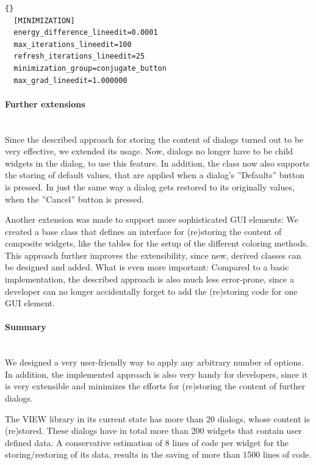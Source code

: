 \begin{lstlisting}{}
  [MINIMIZATION]
  energy_difference_lineedit=0.0001
  max_iterations_lineedit=100
  refresh_iterations_lineedit=25
  minimization_group=conjugate_button
  max_grad_lineedit=1.000000
\end{lstlisting}

\paragraph{Further extensions}
\hspace*{\fill}\\
Since the described approach for storing the content of dialogs turned out to 
be very effective, we extended its usage. Now, dialogs no longer have to be 
child widgets in the  dialog, to use this feature.
In addition, the  class now also supports the storing 
of default values, that are applied when a dialog's ''Defaults'' button is 
pressed. In just the same way a dialog gets restored to its originally values, 
when the ''Cancel'' button is pressed.

Another extension was made to support more sophisticated GUI elements: We
created a base class  that defines an 
interface for (re)storing the content of composite widgets, like \eg the 
tables for the setup of the different coloring methods. This approach further
improves the extensibility, since new, derived 
 classes can be designed and added.
What is even more important: Compared to a basic implementation, the described
approach is also much less error-prone, since a developer can no longer
accidentally forget to add the (re)storing code for one GUI element.

\paragraph{Summary}
\hspace*{\fill}\\
We designed a very user-friendly way to apply any arbitrary number of options. 
In addition, the implemented approach is also very handy for developers, since 
it is very extensible and minimizes the efforts for (re)storing the content of 
further dialogs. 

The VIEW library in its current state has more than 20 dialogs, whose content 
is (re)stored. These dialogs have in total more than 200 widgets that contain 
user defined data. A conservative estimation of 8 lines of code per widget for 
the storing/restoring of its data, results in the saving of more than 1500 
lines of code.



